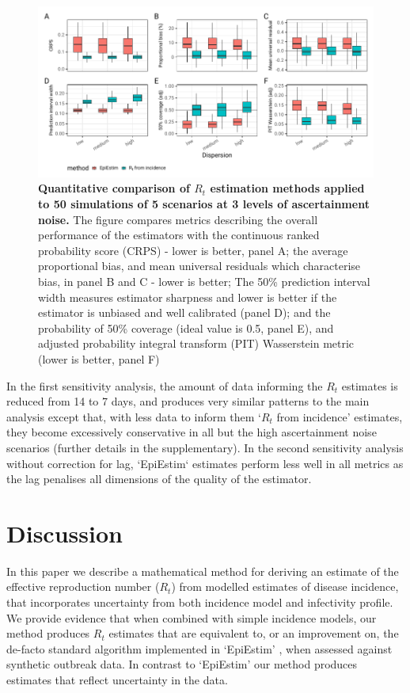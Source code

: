 \documentclass[10pt,letterpaper]{article}
\begin{document}
\begin{figure}[!ht]
\centerline{\includegraphics{fig/fig2-comparison}}
\caption{{\bf Quantitative comparison of $R_t$ estimation methods applied to 50 simulations of 5 scenarios at 3 levels of ascertainment noise.} The figure compares metrics describing the overall performance of the estimators with the continuous ranked probability score (CRPS) - lower is better, panel A; the average proportional bias, and mean universal residuals which characterise bias, in panel B and C - lower is better; The 50\% prediction interval width measures estimator sharpness and lower is better if the estimator is unbiased and well calibrated (panel D); and the probability of 50\% coverage (ideal value is 0.5, panel E), and adjusted probability integral transform (PIT) Wasserstein metric (lower is better, panel F)}
\label{fig2}
\end{figure}

In the first sensitivity analysis, the amount of data informing the $R_t$ estimates is reduced from 14 to 7 days, and produces very similar patterns to the main analysis except that, with less data to inform them `$R_t$ from incidence' estimates, they become excessively conservative in all but the high ascertainment noise scenarios (further details in the supplementary). In the second sensitivity analysis without correction for lag, `EpiEstim` estimates perform less well in all metrics as the lag penalises all dimensions of the quality of the estimator.

\section*{Discussion}

In this paper we describe a mathematical method for deriving an estimate of the effective reproduction number ($R_t$) from modelled estimates of disease incidence, that incorporates uncertainty from both incidence model and infectivity profile. We provide evidence that when combined with simple incidence models, our method produces $R_t$ estimates that are equivalent to, or an improvement on, the de-facto standard algorithm implemented in `EpiEstim' \cite{thompson2019}, when assessed against synthetic outbreak data. In contrast to `EpiEstim' our method produces estimates that reflect uncertainty in the data.
\end{document}
